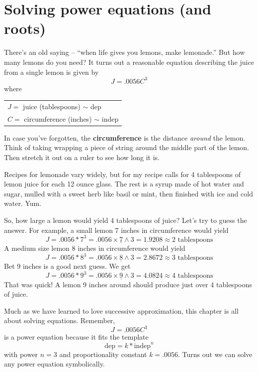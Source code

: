 
\section{Solving power equations (and roots)}

There's an old saying -- ``when life gives you lemons, make lemonade.''  But how many lemons do you need? It turns out a reasonable equation describing the juice from a single lemon is given by 
$$J = .0056C^3$$ where %
\vspace{-.15in} %
\begin{center}
\begin{tabular} {l} 
$J=$ juice (tablespoons) $\sim$ dep \\
$C= $ circumference (inches) $\sim$ indep \\ 
\end{tabular}
\end{center}
In case you've forgotten, the \textbf{circumference} is the distance \emph{around} the lemon. Think of taking wrapping a piece of string around the middle part of the lemon. Then stretch it out on a ruler to see how long it is.  

Recipes for lemonade vary widely, but for my recipe calls for 4 tablespoons of lemon juice for each 12 ounce glass.  The rest is a syrup made of hot water and sugar, mulled with a sweet herb like basil or mint, then finished with ice and cold water. Yum.  

So, how large a lemon would yield 4 tablespoons of juice? Let's try to guess the answer.  
For example, a small lemon 7 inches in circumference would yield 
$$J = .0056 \ast 7^3 = .0056 \times \underline{7} \wedge 3 = 1.9208 \approx 2 \text{ tablespoons}$$ 
A medium size lemon 8 inches in circumference would yield
$$J = .0056 \ast 8^3 = .0056 \times \underline{8} \wedge 3 = 2.8672 \approx 3 \text{ tablespoons}$$ 
Bet 9 inches is a good next guess.  We get
$$J = .0056 \ast 9^3 = .0056 \times \underline{9} \wedge 3 = 4.0824 \approx 4  \text{ tablespoons}$$ 
That was quick!   A lemon 9 inches around should produce just over 4 tablespoons of juice.  %

Much as we have learned to love successive approximation, this chapter is all about solving equations.  Remember, $$J = .0056C^3$$ is a power equation because it fits the template  
$$\text{dep} = k \ast \text{indep}^{n}$$
with power $n=3$ and proportionality constant $k=.0056$.  Turns out we can solve any power equation symbolically.  

